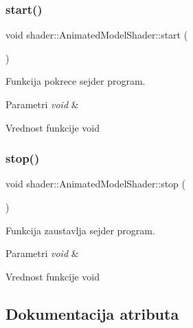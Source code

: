 \subsubsection{\texorpdfstring{start()}{start()}}
{\footnotesize\ttfamily void shader\+::\+Animated\+Model\+Shader\+::start (\begin{DoxyParamCaption}\item[{void}]{ }\end{DoxyParamCaption})}



Funkcija pokrece sejder program. 


\begin{DoxyParams}{Parametri}
{\em void} & \\
\hline
\end{DoxyParams}
\begin{DoxyReturn}{Vrednost funkcije}
void 
\end{DoxyReturn}
\mbox{\label{classshader_1_1AnimatedModelShader_ab50582c18de55c4922fb7d8847836251}} 
\subsubsection{\texorpdfstring{stop()}{stop()}}
{\footnotesize\ttfamily void shader\+::\+Animated\+Model\+Shader\+::stop (\begin{DoxyParamCaption}\item[{void}]{ }\end{DoxyParamCaption})}



Funkcija zaustavlja sejder program. 


\begin{DoxyParams}{Parametri}
{\em void} & \\
\hline
\end{DoxyParams}
\begin{DoxyReturn}{Vrednost funkcije}
void 
\end{DoxyReturn}


\subsection{Dokumentacija atributa}
\mbox{\label{classshader_1_1AnimatedModelShader_a813f2815f75ec8e129c6e8c461acbc74}} 

